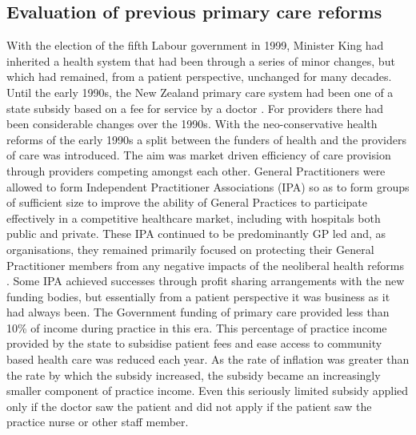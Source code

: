 \documentclass[11pt,a4paper]{article}
\begin{document}
\subsection{Evaluation of previous primary care reforms}
With the election of the fifth Labour government in 1999, Minister King had inherited a health system that had been through a series of minor changes, but which had remained, from a patient perspective, unchanged for many decades. Until the early 1990s, the New Zealand primary care system had been one of a state subsidy based on a fee for service by a doctor \citep{gauld2006new}. For providers there had been considerable changes over the 1990s. With the neo-conservative health reforms of the early 1990s a split between the funders of health and the providers of care was introduced. The aim was market driven efficiency of care provision through providers competing amongst each other. General Practitioners were allowed to form Independent Practitioner Associations (IPA) so as to form groups of sufficient size to improve the ability of General Practices to participate effectively in a competitive healthcare market, including with hospitals both public and private. These IPA continued to be predominantly GP led and, as organisations, they remained primarily focused on protecting their General Practitioner members from any negative impacts of the neoliberal health reforms \citep{malcolm1999new}. Some IPA achieved successes through profit sharing arrangements with the new funding bodies, but essentially from a patient perspective it was business as it had always been. The Government funding of primary care provided less than 10\% of income during practice in this era. This percentage of practice income provided by the state to subsidise patient fees and ease access to community based health care was reduced each year. As the rate of inflation was greater than the rate by which the subsidy increased, the subsidy became an increasingly smaller component of practice income. Even this seriously limited subsidy applied only if the doctor saw the patient and did not apply if the patient saw the practice nurse or other staff member. \\    
\end{document}
